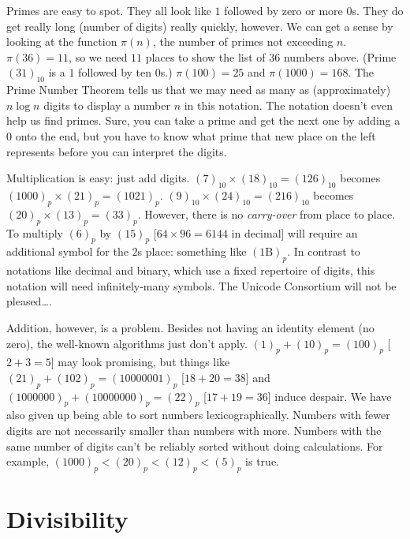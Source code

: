 \documentclass[12pt]{article}
\begin{document}
Primes are easy to spot. They all look like $1$ followed by zero or more $0$s. They do get really long (number of digits) really quickly, however. We can get a sense by looking at the function $\pi(n)$, the number of primes not exceeding $n$. $\pi(36) = 11$, so we need $11$ places to show the list of $36$ numbers above. (Prime $(31)_{10}$ is a $1$ followed by ten $0$s.) $\pi(100) = 25$ and $\pi(1000) = 168$. The Prime Number Theorem tells us that we may need as many as (approximately) $n \log n$ digits to display a number $n$ in this notation. The notation doesn't even help us find primes. Sure, you can take a prime and get the next one by adding a $0$ onto the end, but you have to know what prime that new place on the left represents before you can interpret the digits.

Multiplication is easy: just add digits. $(7)_{10} \times (18)_{10} = (126)_{10}$ becomes $(1000)_p \times (21)_p = (1021)_p$. $(9)_{10} \times (24)_{10} = (216)_{10}$ becomes $(20)_p \times (13)_p = (33)_p$. However, there is no \textit{carry-over} from place to place. To multiply $(6)_p$ by $(15)_p$ [$64 \times 96 = 6144$ in decimal] will require an additional symbol for the $2$s place: something like $(1\mathrm{B})_p$. In contrast to notations like decimal and binary, which use a fixed repertoire of digits, this notation will need infinitely-many symbols. The Unicode Consortium will not be pleased\ldots.

Addition, however, is a problem. Besides not having an identity element (no zero), the well-known algorithms just don't apply. $(1)_p + (10)_p = (100)_p$ [$2+3=5$] may look promising, but things like $(21)_p + (102)_p = (10000001)_p$ [$18+20=38$] and $(1000000)_p + (10000000)_p = (22)_p$ [$17+19=36$] induce despair. We have also given up being able to sort numbers lexicographically. Numbers with fewer digits are not necessarily smaller than numbers with more. Numbers with the same number of digits can't be reliably sorted without doing calculations. For example, $(1000)_p < (20)_p < (12)_p < (5)_p$ is true.

\section*{Divisibility}
\end{document}
